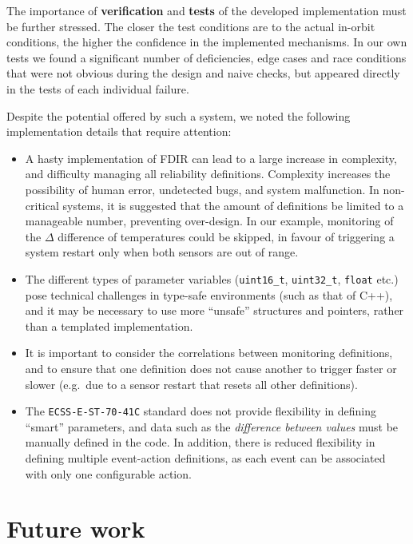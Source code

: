 \documentclass[a4paper,nobib,final]{tufte-book}
\begin{document}
\begin{fullwidth}
The importance of \textbf{verification} and \textbf{tests} of the developed implementation must be further stressed. The closer the test conditions are to the actual in-orbit conditions, the higher the confidence in the implemented mechanisms. In our own tests we found a significant number of deficiencies, edge cases and race conditions that were not obvious during the design and naive checks, but appeared directly in the tests of each individual failure.

Despite the potential offered by such a system, we noted the following implementation details that require attention:
\begin{itemize}
	\item A hasty implementation of \acs{FDIR} can lead to a large increase in complexity, and difficulty managing all reliability definitions. Complexity increases the possibility of human error, undetected bugs, and system malfunction. In non-critical systems, it is suggested that the amount of definitions be limited to a manageable number, preventing over-design. In our example, monitoring of the \(\Delta\) difference of temperatures could be skipped, in favour of triggering a system restart only when both sensors are out of range.
	\item The different types of parameter variables (\texttt{uint16_t}, \texttt{uint32_t}, \texttt{float} etc.) pose technical challenges in type-safe environments (such as that of C++), and it may be necessary to use more ``unsafe'' structures and pointers, rather than a templated implementation.
	\item It is important to consider the correlations between monitoring definitions, and to ensure that one definition does not cause another to trigger faster or slower (e.g.\ due to a sensor restart that resets all other definitions).
	\item The \texttt{ECSS-E-ST-70-41C} standard does not provide flexibility in defining ``smart'' parameters, and data such as the \emph{difference between values} must be manually defined in the code. In addition, there is reduced flexibility in defining multiple event-action definitions, as each event can be associated with only one configurable action.
\end{itemize}

\section{Future work}


\end{fullwidth}
\end{document}
